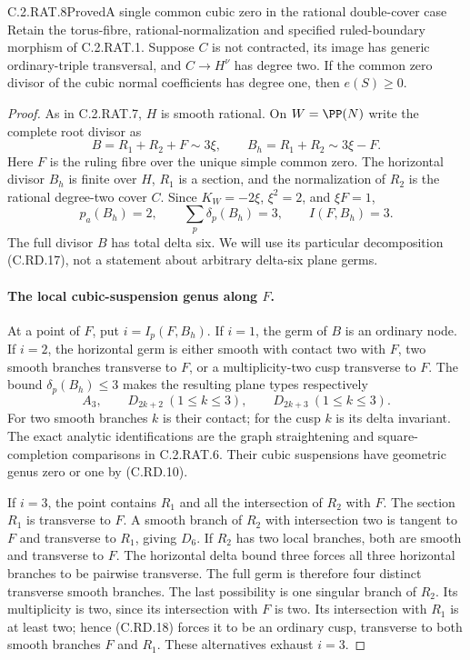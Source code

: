 \begin{statement}{C.2.RAT.8}{Proved}{A single common cubic zero in the rational double-cover case}
Retain the torus-fibre, rational-normalization and specified
ruled-boundary morphism of C.2.RAT.1. Suppose $C$ is not
contracted, its image has generic ordinary-triple transversal,
and $C\to H^\nu$ has degree two. If the common zero divisor
of the cubic normal coefficients has degree one, then
$e(S)\ge0$.
\end{statement}
\begin{proof}
As in C.2.RAT.7, $H$ is smooth rational. On $W=\PP(N)$
write the complete root divisor as
\[
 B=R_1+R_2+F\sim3\xi,
 \qquad B_h=R_1+R_2\sim3\xi-F.
\tag{C.RD.17}
\]
Here $F$ is the ruling fibre over the unique simple
common zero. The horizontal divisor $B_h$ is finite
over $H$, $R_1$ is a section, and the normalization of
$R_2$ is the rational degree-two cover $C$.
Since $K_W=-2\xi$, $\xi^2=2$, and $\xi F=1$,
\[
 p_a(B_h)=2,
 \qquad \sum_p\delta_p(B_h)=3,
 \qquad I(F,B_h)=3.
\tag{C.RD.18}
\]
The full divisor $B$ has total delta six. We will
use its particular decomposition (C.RD.17), not a
statement about arbitrary delta-six plane germs.

\paragraph{The local cubic-suspension genus along $F$.}
At a point of $F$, put $i=I_p(F,B_h)$. If $i=1$,
the germ of $B$ is an ordinary node. If $i=2$,
the horizontal germ is either smooth with contact
two with $F$, two smooth branches transverse to
$F$, or a multiplicity-two cusp transverse to $F$.
The bound $\delta_p(B_h)\le3$ makes the resulting
plane types respectively
\[
 A_3,\qquad D_{2k+2}\ (1\le k\le3),\qquad
                 D_{2k+3}\ (1\le k\le3).
\tag{C.RD.19}
\]
For two smooth branches $k$ is their contact;
for the cusp $k$ is its delta invariant.
The exact analytic identifications are the graph
straightening and square-completion comparisons
in C.2.RAT.6. Their cubic suspensions have
geometric genus zero or one by (C.RD.10).

If $i=3$, the point contains $R_1$ and all the
intersection of $R_2$ with $F$. The section $R_1$
is transverse to $F$. A smooth branch of $R_2$
with intersection two is tangent to $F$ and
transverse to $R_1$, giving $D_6$. If $R_2$ has
two local branches, both are smooth and transverse
to $F$. The horizontal delta bound three forces
all three horizontal branches to be pairwise
transverse. The full germ is therefore four
distinct transverse smooth branches.
The last possibility is one singular branch
of $R_2$. Its multiplicity is two, since its
intersection with $F$ is two. Its intersection
with $R_1$ is at least two; hence (C.RD.18)
forces it to be an ordinary cusp, transverse
to both smooth branches $F$ and $R_1$.
These alternatives exhaust $i=3$.


\end{proof}
